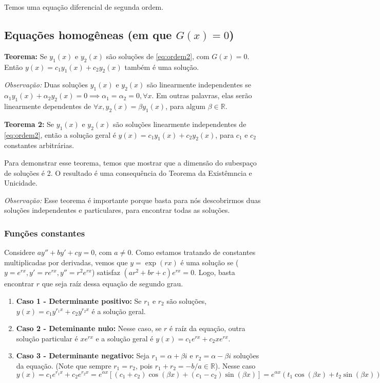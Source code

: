 \documentclass[12pt]{article}
\begin{document}
Temos uma equação diferencial de segunda ordem.

\subsection{Equações homogêneas (em que $G(x) = 0$)}

\textbf{Teorema:} Se $y_1(x)$ e $y_2(x)$ são soluções de \ref{eq:ordem2}, com
$G(x) = 0$. Então $y(x) = c_1y_1(x) + c_2y_2(x)$ também é uma solução. 

\textit{Observação:} Duas soluções $y_1(x)$ e $y_2(x)$ são linearmente
independentes se $\alpha_1y_1(x) + \alpha_2y_2(x) = 0 \implies \alpha_1 =
\alpha_2 = 0, \forall x$. Em outras palavras, elas serão linearmente
dependentes de $\forall x, y_2(x) = \beta y_1(x)$, para algum $\beta \in
\mathbb{R}$.  

\textbf{Teorema 2:} Se $y_1(x)$ e $y_2(x)$ são soluções linearmente
independentes de \ref{eq:ordem2}, então a solução geral é $y(x) = c_1y_1(x) +
c_2y_2(x)$, para $c_1$ e $c_2$ constantes arbitrárias. 

Para demonstrar esse teorema, temos que mostrar que a dimensão do subespaço de
soluções é 2. O resultado é uma consequência do Teorema da Existêmncia e
Unicidade. 

\textit{Observação:} Esse teorema é importante porque basta para nós
descobrirmos duas soluções independentes e particulares, para encontrar todas
as soluções. 

\subsubsection{Funções constantes}

Considere $ay'' + by' + cy = 0$, com $a \neq 0$. Como estamos tratando de
constantes multiplicadas por derivadas, vemos que $y = \exp(rx)$ é uma
solução se ($y = e^{rx}, y' = re^{rx}, y'' = r^2e^{rx}$) satisfaz $(ar^2 + br
+ c)e^{rx} = 0$. Logo, basta encontrar $r$ que seja raíz dessa equação de
segundo grau. 

\begin{enumerate}
    \item \textbf{Caso 1 - Determinante positivo:} Se $r_1$ e $r_2$ são
    soluções, $y(x) = c_1y^{r_1x} + c_2y^{r_2x}$ é a solução geral.
    \item \textbf{Caso 2 - Deteminante nulo:} Nesse caso, se $r$ é raíz da
    equação, outra solução particular é $xe^{rx}$ e a solução geral é $y(x) =
    c_1e^{rx} + c_2xe^{rx}$.  
    \item \textbf{Caso 3 - Determinante negativo:} Seja $r_1 = \alpha + \beta
    i$ e $r_2 = \alpha - \beta i$ soluções da equação. (Note que sempre $r_1
    = r_2$, pois $r_1 + r_2 = -b/a \in \mathbb{R}$).  Nesse caso $y(x) =
    c_1e^{r_1x} + c_2e^{r_2x} = e^{\alpha x}[(c_1 + c_2)\cos(\beta x) + (c_1 -
    c_2)\sin(\beta x)] = e^{\alpha x}(t_1\cos(\beta x) + t_2\sin(\beta x))$
\end{enumerate}
\end{document}
